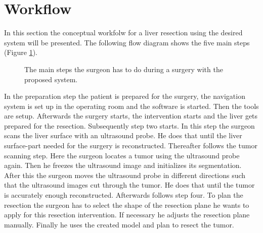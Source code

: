 \section{Workflow}
In this section the conceptual workfolw for a liver resection using the
desired system will be presented. The following flow diagram shows the five main
steps (Figure \ref{fig:conceptWorkflow}).
\begin{figure}[H]
  \centering
  \caption{The main steps the surgeon has to do during a surgery with the
    proposed system.}
  \label{fig:conceptWorkflow}
\end{figure}
In the preparation step the patient is prepared for the surgery, the
navigation system is set up in the operating room and the software is started.
Then the tools are setup. Afterwards the surgery starts, the intervention starts and the liver gets
prepared for the resection. Subsequently step two starts. In this step the
surgeon scans the liver surface with an ultrasound probe. He does that until the liver
surface-part needed for the surgery is reconstructed. Thereafter
follows the tumor scanning step. Here the surgeon locates a tumor using the
ultrasound probe again. Then he freezes the ultrasound image and initializes its
segmentation. After this the surgeon moves the ultrasound probe in
different directions such that the ultrasound images cut through the tumor. He
does that until the tumor is accurately enough reconstructed. Afterwards follows
step four. To plan the resection the surgeon has to select the shape of the
resection plane he wants to apply for this resection intervention. If necessary
he adjusts the resection plane manually. Finally he uses the created model and
plan to resect the tumor. 


